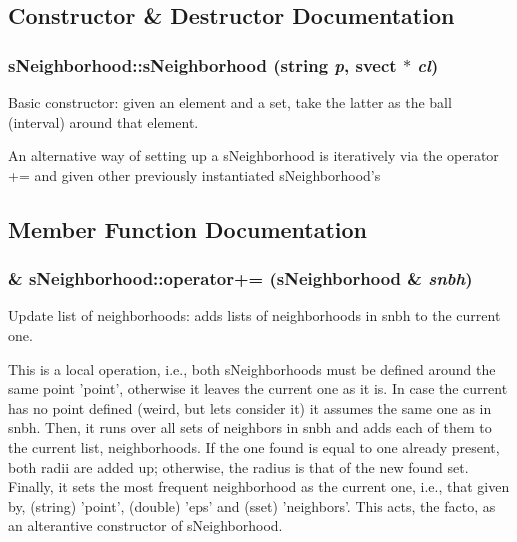 \subsection{Constructor \& Destructor Documentation}
\subsubsection{\setlength{\rightskip}{0pt plus 5cm}s\-Neighborhood::s\-Neighborhood (string {\em p}, svect $\ast$ {\em cl})}\label{classsNeighborhood_a1}


Basic constructor: given an element and a set, take the latter as the ball (interval) around that element. 

An alternative way of setting up a s\-Neighborhood is iteratively via the operator += and given other previously instantiated s\-Neighborhood's

\subsection{Member Function Documentation}
\subsubsection{ \& s\-Neighborhood::operator+= ({\bf s\-Neighborhood} \& {\em snbh})}\label{classsNeighborhood_a6}


Update list of neighborhoods: adds lists of neighborhoods in snbh to the current one. 

This is a local operation, i.e., both s\-Neighborhoods must be defined around the same point 'point', otherwise it leaves the current one as it is. In case the current has no point defined (weird, but lets consider it) it assumes the same one as in snbh. Then, it runs over all sets of neighbors in snbh and adds each of them to the current list, neighborhoods. If the one found is equal to one already present, both radii are added up; otherwise, the radius is that of the new found set. Finally, it sets the most frequent neighborhood as the current one, i.e., that given by, (string) 'point', (double) 'eps' and (sset) 'neighbors'. This acts, the facto, as an alterantive constructor of s\-Neighborhood.
